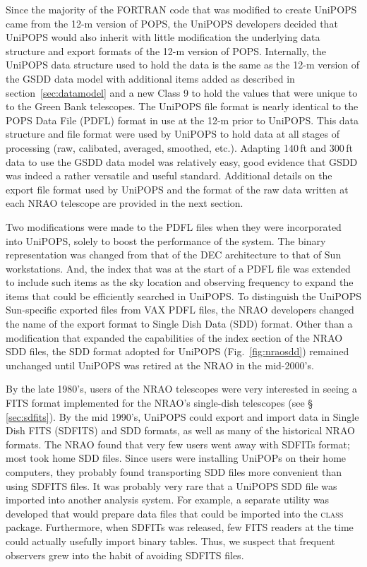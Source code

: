 \documentclass[final,authoryear,5p,times,twocolumn]{elsarticle}
\begin{document}
Since the majority of the FORTRAN code that was modified to create
UniPOPS came from the 12-m version of POPS, the UniPOPS developers
decided that UniPOPS would also inherit with little modification the
underlying data structure and export formats of the 12-m version of
POPS.  Internally, the UniPOPS data structure used to hold the data
is the same as the 12-m version of the GSDD data model with additional
items added as described in section~\ref{sec:datamodel} and a new Class 9 to hold
the values that were unique to to the Green Bank telescopes. The UniPOPS
file format is nearly identical to the POPS Data File (PDFL) format
in use at the 12-m prior to UniPOPS. This
data structure and file format were used by UniPOPS to hold data at
all stages of processing (raw, calibated, averaged, smoothed, etc.).
Adapting 140\,ft and 300\,ft data to use the GSDD data model was
relatively easy, good evidence that GSDD was indeed a rather versatile
and useful standard.  Additional details on the export file format
used by UniPOPS and the format of the raw data written at each
NRAO telescope are provided in the next section.

Two modifications were made to the PDFL files when they were
incorporated into UniPOPS, solely to boost the performance of the
system.  The binary representation was changed from that of the DEC
architecture to that of Sun workstations.  And, the index that was at
the start of a PDFL file was extended to include such items as the sky
location and observing frequency to expand the items that could be
efficiently searched in UniPOPS.  To distinguish the UniPOPS
Sun-specific exported files from VAX PDFL files, the NRAO developers
changed the name of the export format to Single Dish Data (SDD) format.
Other than a modification that expanded the capabilities of the index
section of the NRAO SDD files, the SDD format adopted for UniPOPS
(Fig.~\ref{fig:nraosdd}) remained unchanged until UniPOPS was retired
at the NRAO in the mid-2000's.

By the late 1980's, users of the NRAO telescopes were very interested
in seeing a FITS format implemented for the NRAO's single-dish
telescopes (see \S\,\ref{sec:sdfits}). By the mid 1990's,
UniPOPS could export and import data in Single Dish FITS (SDFITS) and
SDD formats, as well as many
of the historical NRAO formats.  The NRAO found that very few users
went away with SDFITs format; most took home SDD files.  Since
users were installing UniPOPs on their home computers, they probably
found transporting SDD files more convenient than using
SDFITS files.  It was probably very rare that a UniPOPS SDD file was
imported into another analysis system.  For example, a separate
utility was developed that would prepare data files that could be
imported into the \textsc{class} package.
Furthermore, when SDFITs was released, few FITS readers at the
time could actually usefully import binary tables.  Thus, we suspect
that frequent observers grew into the habit of avoiding SDFITS files.
\end{document}
